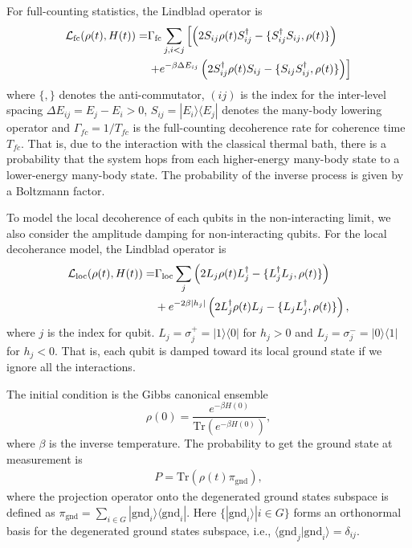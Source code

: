 \documentclass[10pt]{iopart}
\begin{document}
For full-counting statistics, the Lindblad operator is
\begin{align}
\mathcal{L}_{\textrm{fc}}(\rho (t), H(t)) = & \Gamma_{\textrm{fc}} \sum_{j, i<j} \left[  \left(2 S_{ij} \rho(t) S_{ij}^\dagger - \{ S^\dagger_{ij} S_{ij}, \rho(t) \}\right) \notag \right.
\\
& \left. + e^{-\beta \Delta E_{ij}} \left(2 S_{ij}^\dagger \rho(t) S_{ij} - \{ S_{ij} S^\dagger_{ij}, \rho(t) \} \right)\right]
\end{align}
where $\{, \}$ denotes the anti-commutator, $(ij)$ is the index for the inter-level spacing $\Delta E_{ij}=E_j-E_i>0$,  $S_{ij}=|E_i \rangle \langle E_j|$ denotes the many-body lowering operator and $\Gamma_{fc} = 1/T_{fc}$ is the full-counting decoherence rate for coherence time $T_{fc}$.
That is, due to the interaction with the classical thermal bath, there is a probability that the system hops from each higher-energy many-body state to a lower-energy many-body state.
The probability of the inverse process is given by a Boltzmann factor.

To model the local decoherence of each qubits in the non-interacting limit, we also consider the amplitude damping for non-interacting qubits.
For the local decoherance model, the Lindblad operator is
\begin{align}
\mathcal{L}_{\textrm{loc}}(\rho (t), H(t)) = &  \Gamma_{\textrm{loc}} \sum_j \left(2L_j \rho(t) L_j^\dagger - \{ L^\dagger_j L_j, \rho(t) \} \right)\notag \\
& + e^{- 2 \beta |h_j| }  \left(2L_j^\dagger \rho(t) L_j - \{ L_j L_j^\dagger, \rho(t) \} \right) ,
\end{align}
where $j$ is the index for qubit.
$L_j= \sigma^{+}_j=|1\rangle \langle 0|$ for $h_j>0$ and $L_j= \sigma^{-}_j=|0\rangle \langle 1|$ for $h_j<0$.
That is, each qubit is damped toward its local ground state if we ignore all the interactions.

The initial condition is the Gibbs canonical ensemble
\begin{equation}
\rho (0) =  \frac{e^{-\beta H(0)}}{\mbox{Tr}\left(e^{-\beta H(0)}\right)} ,
\end{equation}
where $\beta$ is the inverse temperature.
The probability to get the ground state at measurement is
\begin{align}
P =  \mbox{Tr} \left( \rho (t) \pi_{\mbox{gnd}} \right)  ,
\end{align}
where the projection operator onto the degenerated ground states subspace is defined as $\pi_{\mbox{gnd}}=\sum_{i\in G} |\mbox{gnd}_i\rangle \langle \mbox{gnd}_i| $.
Here $\{ | \mbox{gnd}_i \rangle | i \in G \}$ forms an orthonormal basis for the degenerated ground states subspace, i.e., $\langle \mbox{gnd}_j | \mbox{gnd}_i \rangle = \delta_{ij}$.
\end{document}
